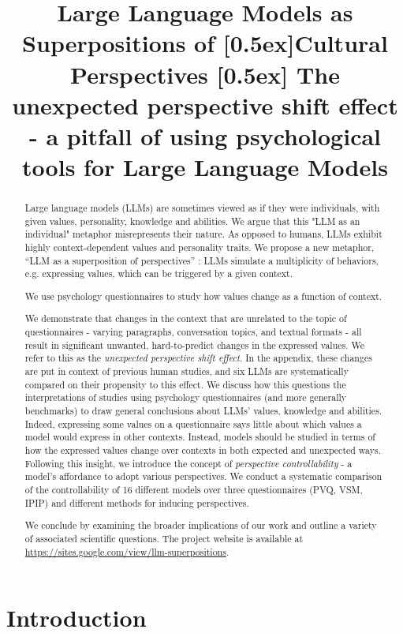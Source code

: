 \title{Large Language Models as Superpositions of [0.5ex]Cultural Perspectives [0.5ex] The unexpected perspective shift effect - a pitfall of using psychological tools for Large Language Models}

\begin{abstract}
Large language models (LLMs) are sometimes viewed as if they were individuals, with given values, personality, knowledge and abilities. We argue that this "LLM as an individual" metaphor misrepresents their nature. As opposed to humans, LLMs exhibit highly context-dependent values and personality traits. We propose a new metaphor, ``LLM as a superposition of perspectives'' : LLMs simulate a multiplicity of behaviors, e.g. expressing values, which can be triggered by a given context.

We use psychology questionnaires to study how values change as a function of context.

We demonstrate that changes in the context that are unrelated to the topic of questionnaires - varying paragraphs, conversation topics, and textual formats - all result in significant unwanted, hard-to-predict changes in the expressed values. We refer to this as the \textit{unexpected perspective shift effect}. In the appendix, these changes are put in context of previous human studies, and six LLMs are systematically compared on their propensity to this effect. We discuss how this questions the interpretations of studies using psychology questionnaires (and more generally benchmarks) to draw general conclusions about LLMs' values, knowledge and abilities. Indeed, expressing some values on a questionnaire says little about which values a model would express in other contexts. Instead, models should be studied in terms of how the expressed values change over contexts in both expected and unexpected ways. Following this insight, we introduce the concept of \textit{perspective controllability} - a model’s affordance to adopt various perspectives. We conduct a systematic comparison of the controllability of 16 different models over three questionnaires (PVQ, VSM, IPIP) and different methods for inducing perspectives.

We conclude by examining the broader implications of our work and outline a variety of associated scientific questions. The project website is available at \small \url{https://sites.google.com/view/llm-superpositions}.
\end{abstract}

\section{Introduction}

